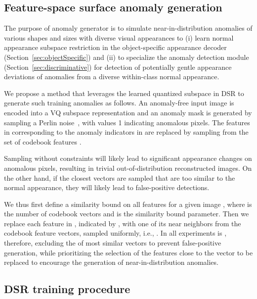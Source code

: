 \documentclass[runningheads]{llncs}
\begin{document}
\subsection{Feature-space surface anomaly generation} \label{sec:anomgen}

The purpose of anomaly generator is to simulate near-in-distribution anomalies of various shapes and sizes with diverse visual appearances to (i) learn normal appearance subspace restriction in the 
object-specific appearance decoder (Section~\ref{sec:objectSpecific}) and (ii) to specialize the anomaly detection module (Section~\ref{sec:discriminative}) for detection of potentially gentle appearance deviations of anomalies from a diverse within-class normal appearance. 



We propose a method that leverages the learned quantized subspace in DSR to generate such training anomalies as follows.
An anomaly-free input image  is encoded into a VQ subspace representation  and an anomaly mask  is generated by sampling a Perlin noise~\cite{perlin1985image}, with values 1 indicating anomalous pixels. The features in  corresponding to the anomaly indicators in  are replaced by sampling from the set of codebook features . 

Sampling without constraints will likely lead to significant appearance changes on anomalous pixels, resulting in trivial out-of-distribution reconstructed images. On the other hand, if the closest vectors are sampled that are too similar to the normal appearance, they will likely lead to false-positive detections.

We thus first define a similarity bound on all features for a given image , where  is the number of codebook vectors and  is the similarity bound parameter. Then we replace each feature in , indicated by , with one of its near neighbors from the codebook feature vectors, sampled uniformly, i.e., . In all experiments  is , therefore, excluding the  of most similar vectors to prevent false-positive generation, while prioritizing the selection of the features close to the vector to be replaced to encourage the generation of near-in-distribution anomalies. 





\subsection{DSR training procedure}\label{sec:train}
\end{document}

